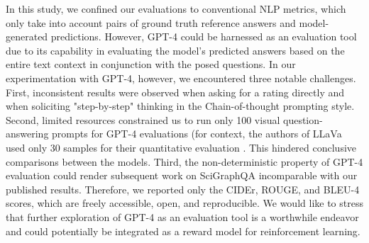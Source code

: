 \documentclass{article}
\begin{document}
In this study, we confined our evaluations to conventional NLP metrics, which only take into account pairs of ground truth reference answers and model-generated predictions. However, GPT-4 could be harnessed as an evaluation tool due to its capability in evaluating the model's predicted answers based on the entire text context in conjunction with the posed questions. In our experimentation with GPT-4, however, we encountered three notable challenges.
First, inconsistent results were observed when asking for a rating directly and when soliciting "step-by-step" thinking in the Chain-of-thought prompting style. Second, limited resources constrained us to run only 100 visual question-answering prompts for GPT-4 evaluations (for context, the authors of LLaVa used only 30 samples for their quantitative evaluation \cite{liu2023}. This hindered conclusive comparisons between the models.
Third, the non-deterministic property of GPT-4 evaluation could render subsequent work on SciGraphQA incomparable with our published results. Therefore, we reported only the CIDEr, ROUGE, and BLEU-4 scores, which are freely accessible, open, and reproducible. We would like to stress that further exploration of GPT-4 as an evaluation tool is a worthwhile endeavor and could potentially be integrated as a reward model for reinforcement learning.


\end{document}
